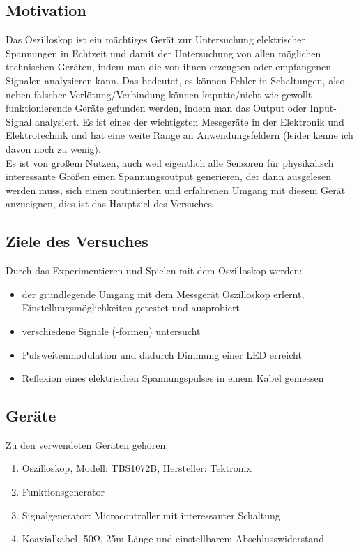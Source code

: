 \subsection{Motivation}
Das Oszilloskop ist ein mächtiges Gerät zur Untersuchung elektrischer Spannungen in Echtzeit und damit der Untersuchung von allen möglichen technischen Geräten, indem man die von ihnen erzeugten oder empfangenen Signalen analysieren kann. Das bedeutet, es können Fehler in Schaltungen, also neben falscher Verlötung/Verbindung können kaputte/nicht wie gewollt funktionierende Geräte gefunden werden, indem man das Output oder Input-Signal analysiert. Es ist eines der wichtigsten Messgeräte in der Elektronik und Elektrotechnik und hat eine weite Range an Anwendungsfeldern (leider kenne ich davon noch zu wenig).\\
Es ist von großem Nutzen, auch weil eigentlich alle Sensoren für physikalisch interessante Größen einen Spannungsoutput generieren, der dann ausgelesen werden muss, sich einen routinierten und erfahrenen Umgang mit diesem Gerät anzueignen, dies ist das Hauptziel des Versuches.
\subsection{Ziele des Versuches}
Durch das Experimentieren und Spielen mit dem Oszilloskop werden:
\begin{itemize}
    \item der grundlegende Umgang mit dem Messgerät Oszilloskop erlernt, Einstellungsmöglichkeiten getestet und ausprobiert
    \item verschiedene Signale (-formen) untersucht
    \item Pulsweitenmodulation und dadurch Dimmung einer LED erreicht
    \item Reflexion eines elektrischen Spannungspulses in einem Kabel gemessen
\end{itemize}

\subsection{Geräte}
Zu den verwendeten Geräten gehören:
\begin{enumerate}
    \item Oszilloskop, Modell: TBS1072B, Hersteller: Tektronix
    \item Funktionsgenerator
    \item Signalgenerator: Microcontroller mit interessanter Schaltung
    \item Koaxialkabel, 50\unit{\ohm}, 25m Länge und einstellbarem Abschlusswiderstand
\end{enumerate}

